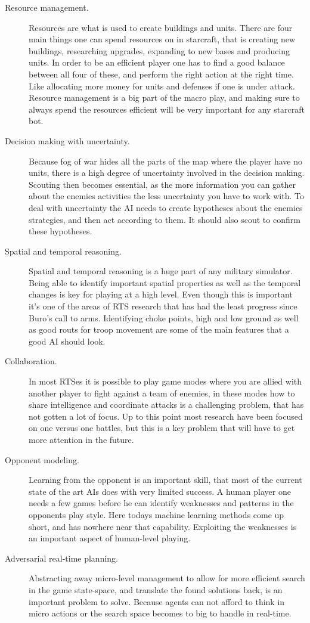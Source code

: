 \begin{description}
  \item [Resource management.] Resources are what is used to create buildings and units. There are four main things one can spend resources on in starcraft, that is creating new buildings, researching upgrades, expanding to new bases and producing units. In order to be an efficient player one has to find a good balance between all four of these, and perform the right action at the right time. Like allocating more money for units and defenses if one is under attack. Resource management is a big part of the macro play, and making sure to always spend the resources efficient will be very important for any starcraft bot.
  \item [Decision making with uncertainty.] Because fog of war hides all the parts of the map where the player have no units, there is a
    high degree of uncertainty involved in the decision making. Scouting then becomes essential, as the more information you can gather about the enemies activities the less uncertainty you have to work with. To deal with uncertainty the AI needs to create hypotheses about the enemies strategies, and then act according to them. It should also scout to confirm these hypotheses.
  \item [Spatial and temporal reasoning.] Spatial and temporal reasoning is a huge part of any military simulator. Being able to identify important spatial properties as well as the temporal changes is key for playing at a high level. Even though this is important it's one of the areas of RTS research that has had the least progress since Buro's call to arms. Identifying choke points, high and low ground as well as good routs for troop movement are some of the main features that a good AI should look. 
  \item [Collaboration.] In most RTSes it is possible to play game modes where you are allied with another player to fight against a team of enemies, in these modes how to share intelligence and coordinate attacks is a challenging problem, that has not gotten a lot of focus. Up to this point most research have been focused on one versus one battles, but this is a key problem that will have to get more attention in the future. 
  \item [Opponent modeling.] Learning from the opponent is an important skill, that most of the current state of the art AIs does with very limited success. A human player one needs a few games before he can identify weaknesses and patterns in the opponents play style. Here todays machine learning methods come up short, and has nowhere near that capability. Exploiting the weaknesses is an important aspect of human-level playing.
  \item [Adversarial real-time planning.] Abstracting away micro-level management to allow for more efficient search in the game state-space, and translate the found solutions back, is an important problem to solve. Because agents can not afford to think in micro actions or the search space becomes to big to handle in real-time. 
\end{description}

